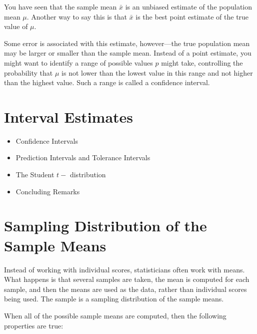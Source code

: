\documentclass[]{report}
\begin{document}
You have seen that the sample mean $\bar{x}$ is an unbiased estimate of the population mean $\mu$. 
Another way to say this is that $\bar{x}$  is the best point estimate of the true value of $\mu$. 



Some error is associated with this estimate, however—the true population mean may be larger 
or smaller than the sample mean. Instead of a point estimate, you might want to identify a 
range of possible values $p$ might take, controlling the probability that $\mu$ is not lower 
than the lowest value in this 
range and not higher than the highest value. Such a range is called a confidence interval.





\section{Interval Estimates}
\begin{itemize}
\item Confidence Intervals
\item Prediction Intervals and Tolerance Intervals
\item The Student $t-$ distribution
\item Concluding Remarks
\end{itemize}







\section{Sampling Distribution of the Sample Means}


Instead of working with individual scores, statisticians often work with means. What happens is that several samples are taken, the mean is computed for each sample, and then the means are used as the data, rather than individual scores being used. The sample is a sampling distribution of the sample means.

When all of the possible sample means are computed, then the following properties are true:
\end{document}
